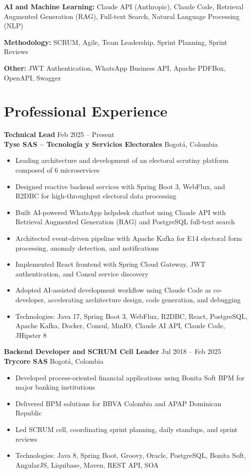 \documentclass[11pt,a4paper]{article}
\begin{document}
\textbf{AI and Machine Learning:} Claude API (Anthropic), Claude Code, Retrieval Augmented Generation (RAG), Full-text Search, Natural Language Processing (NLP)

\textbf{Methodology:} SCRUM, Agile, Team Leadership, Sprint Planning, Sprint Reviews

\textbf{Other:} JWT Authentication, WhatsApp Business API, Apache PDFBox, OpenAPI, Swagger

\section{Professional Experience}

\textbf{Technical Lead} \hfill Feb 2025 -- Present \\
\textbf{Tyse SAS -- Tecnolog\'{i}a y Servicios Electorales} \hfill Bogot\'{a}, Colombia
\begin{itemize}
    \item Leading architecture and development of an electoral scrutiny platform composed of 6 microservices
    \item Designed reactive backend services with Spring Boot 3, WebFlux, and R2DBC for high-throughput electoral data processing
    \item Built AI-powered WhatsApp helpdesk chatbot using Claude API with Retrieval Augmented Generation (RAG) and PostgreSQL full-text search
    \item Architected event-driven pipeline with Apache Kafka for E14 electoral form processing, anomaly detection, and notifications
    \item Implemented React frontend with Spring Cloud Gateway, JWT authentication, and Consul service discovery
    \item Adopted AI-assisted development workflow using Claude Code as co-developer, accelerating architecture design, code generation, and debugging
    \item Technologies: Java 17, Spring Boot 3, WebFlux, R2DBC, React, PostgreSQL, Apache Kafka, Docker, Consul, MinIO, Claude AI API, Claude Code, JHipster 8
\end{itemize}

\vspace{6pt}

\textbf{Backend Developer and SCRUM Cell Leader} \hfill Jul 2018 -- Feb 2025 \\
\textbf{Trycore SAS} \hfill Bogot\'{a}, Colombia
\begin{itemize}
    \item Developed process-oriented financial applications using Bonita Soft BPM for major banking institutions
    \item Delivered BPM solutions for BBVA Colombia and APAP Dominican Republic
    \item Led SCRUM cell, coordinating sprint planning, daily standups, and sprint reviews
    \item Technologies: Java 8, Spring Boot, Groovy, Oracle, PostgreSQL, Bonita Soft, AngularJS, Liquibase, Maven, REST API, SOA
\end{itemize}
\end{document}

